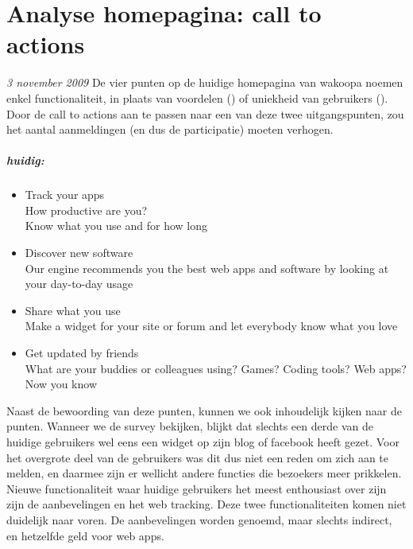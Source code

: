 \chapter{Analyse homepagina: call to actions}
\label{analysehomeappendix}
\textit{3 november 2009} De vier punten op de huidige homepagina van wakoopa noemen enkel functionaliteit, in plaats van voordelen (\citet{Hoekman2008}) of uniekheid van gebruikers (\citet{Beenen2004}). Door de call to actions aan te passen naar een van deze twee uitgangspunten, zou het aantal aanmeldingen (en dus de participatie) moeten verhogen.

\paragraph{huidig:}
\begin{itemize}
    \item{Track your apps\\
      How productive are you?\\
      Know what you use and for how long}

    \item{Discover new software\\
      Our engine recommends you the best web apps and software by looking at your day-to-day usage}

    \item{Share what you use\\
      Make a widget for your site or forum and let everybody know what you love}

    \item{Get updated by friends\\
      What are your buddies or colleagues using? Games? Coding tools? Web apps? Now you know}
\end{itemize}

Naast de bewoording van deze punten, kunnen we ook inhoudelijk kijken naar de punten. Wanneer we de survey bekijken, blijkt dat slechts een derde van de huidige gebruikers wel eens een widget op zijn blog of facebook heeft gezet. Voor het overgrote deel van de gebruikers was dit dus niet een reden om zich aan te melden, en daarmee zijn er wellicht andere functies die bezoekers meer prikkelen. Nieuwe functionaliteit waar huidige gebruikers het meest enthousiast over zijn zijn de aanbevelingen en het web tracking. Deze twee functionaliteiten komen niet duidelijk naar voren. De aanbevelingen worden genoemd, maar slechts indirect, en hetzelfde geld voor web apps.


